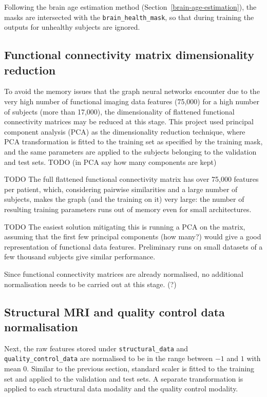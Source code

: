 Following the brain age estimation method (Section~\ref{brain-age-estimation}), the masks are intersected with the \texttt{brain\_health\_mask}, so that during training the outputs for unhealthy subjects are ignored. 

\subsection{Functional connectivity matrix dimensionality reduction}
To avoid the memory issues that the graph neural networks encounter due to the very high number of functional imaging data features (75,000) for a high number of subjects (more than 17,000), the dimensionality of flattened functional connectivity matrices may be reduced at this stage. This project used principal component analysis (PCA) as the dimensionality reduction technique, where PCA transformation is fitted to the training set as specified by the training mask, and the same parameters are applied to the subjects belonging to the validation and test sets.
TODO (in PCA say how many components are kept)

TODO The full flattened functional connectivity matrix has over 75,000 features per patient, which, considering pairwise similarities and a large number of subjects, makes the graph (and the training on it) very large: the number of resulting training parameters runs out of memory even for small architectures.

TODO The easiest solution mitigating this is running a PCA on the matrix, assuming that the first few principal components (how many?) would give a good representation of functional data features. Preliminary runs on small datasets of a few thousand subjects give similar performance.


Since functional connectivity matrices are already normalised, no additional normalisation needs to be carried out at this stage. (?)

\subsection{Structural MRI and quality control data normalisation}
Next, the raw features stored under \texttt{structural\_data} and \texttt{quality\_control\_data} are normalised to be in the range between $-1$ and $1$ with mean 0. Similar to the previous section, standard scaler is fitted to the training set and applied to the validation and test sets. A separate transformation is applied to each structural data modality and the quality control modality.

